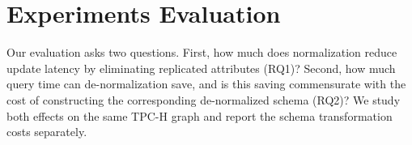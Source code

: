 \documentclass[sigconf]{acmart}
\begin{document}

\section{Experiments Evaluation} \label{sec:experiments}

Our evaluation asks two questions. First, how much does normalization reduce update latency by eliminating replicated attributes (RQ1)? Second, how much query time can de-normalization save, and is this saving commensurate with the cost of constructing the corresponding de-normalized schema (RQ2)? We study both effects on the same TPC-H graph and report the schema transformation costs separately.
\end{document}
